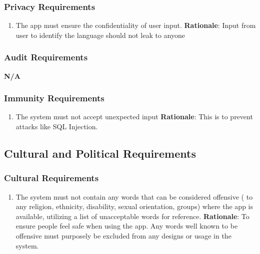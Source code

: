 \subsubsection{Privacy Requirements}
\label{ssub:privacy_requirements}
\begin{enumerate}[{SR-P}1. ]
	\item The app must ensure the confidentiality of user input. 
	\textbf{Rationale}: Input from user to identify the language should not leak to anyone 
\end{enumerate}

\subsubsection{Audit Requirements}
\label{ssub:audit_requirements}
\textbf{N/A}

\subsubsection{Immunity Requirements}
\label{ssub:immunity_requirements}
\begin{enumerate}[{SR-IM}1. ]
	\item The system must not accept unexpected input
	\textbf{Rationale}: This is to prevent attacks like SQL Injection.
\end{enumerate}


\subsection{Cultural and Political Requirements}
\label{sub:cultural_and_political_requirements}

\subsubsection{Cultural Requirements}
\label{ssub:cultural_requirements}
\begin{enumerate}[{CP-C}1. ]
	\item The system must not contain any words that can be considered offensive ( to any religion, ethnicity, disability, sexual orientation, groups) where the app is available, utilizing a list of unacceptable words for reference.
	\textbf{Rationale}: To ensure people feel safe when using the app.  Any words well known to be offensive must purposely be 	excluded from any designs or usage in the system. 
\end{enumerate}

